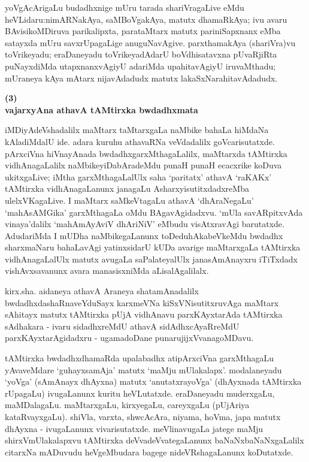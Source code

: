 yoVgAcArigaLu budadhxnige mUru tarada shariVragaLive eMdu heVLidaru:\break nimARNa\-kAya, saMBoVgakAya, matutx dhamaRkAya; ivu avaru BAvisi\-koMDi\-ruva parikalipxta, parataMtarx matutx pariniSapxnanx eMba satayxda mUru savxrUpagaLige anuguNa\-vAgive. parxthamakAya (shariVra)vu toVrikeyadu; eraDaneyadu toVrikeyadAdarU boVdhisatavxna pUvaRjiRta puNayxdiMda utapxnanxvAgiyU adariMda upahitavAgiyU iruvaMthadu; mUraneya kAya mAtarx nijavAdadudx matutx lakaSxNarahitavAdadudx.

\newpage

\begin{center}
{\textbf{\Large (3)}}\\[5pt]
{\textbf{\Large vajarxyAna athavA tAMtirxka bwdadhxmata}}
\end{center}

iMDiyAdeVshadalilx maMtarx taMtarxgaLa naMbike bahaLa hiMdaNa kAladiMdalU ide. adara kuruhu athavaRNa veVdadalilx goVcarisutatxde. pArxciVna hiVnayAnada bwdadhxgarxMthagaLalilx, maMtarxda tAMtirxka vidhAnagaLalilx naMbikeyiDabAradeMdu punaH punaH ecacxrike koDuva ukitxgaLive; iMtha garxMthagaLalUlx saha `paritatx' athavA `raKAKx' tAMtirxka vidhAnagaLanunx janagaLu AsharxyisutitxdadxreMba ulelxVKagaLive. I maMtarx saMkeVtagaLu athavA `dhAraNegaLu' `mahAsAMGika' garxMthagaLa oMdu BAgavAgidadxvu. `mUla savARpitxvAda vinaya'dalilx `mahAmAyAviV dhAriNiV' eMbudu visAtxravAgi barutatxde. AdudariMda I mUDha naMbikegaLanunx toDeduhAkabeVkeMdu bwdadhx sharxmaNaru bahaLavAgi yatinxsidarU kUDa avarige maMtarxgaLa tAMtirxka vidhAnagaLalUlx matutx avugaLa saPalateyalUlx janasAmAnayxru iTiTxdadx vishAvxsavanunx avara manasisxniMda aLisalAgalilalx.

kirx.sha. aidaneya athavA Araneya shatamAnadalilx bwdadhxdashaRnaveYduSayx karxmeVNa kiSxVNisutitxruvAga maMtarx sAhitayx matutx tAMtirxka pUjA vidhAnavu parxKAyxtarAda tAMtirxka sAdhakara - ivaru sidadhxreMdU athavA sidAdhxcAyaRreMdU parxKAyxtarAgidadxru - ugamadoDane punarujijxVvanagoMDavu.

tAMtirxka bwdadhxdhamaRda upalabadhx atipArxciVna garxMthagaLu yAvaveMdare `guhayxsamAja' matutx `maMju mUlakalapx'. modalaneyadu `yoVga' (sAmAnayx dhAyxna) matutx `anutatxrayoVga' (dhAyxnada tAMtirxka rUpagaLu) ivugaLanunx kuritu heVLutatxde. eraDaneyadu muderxgaLu, maMDalagaLu. maMtarxgaLu, kirxyegaLu, careyxgaLu (pUjAriya kataRvayxgaLu). shiVla, varxta, shwcAcAra, niyama, hoVma, japa matutx dhAyxna - ivugaLanunx vivarisutatxde. meVlinavugaLa jatege maMju shirxVmUlakalapxvu tAMtirxka deVvadeVvategaLanunx baNaNxbaNaNxgaLalilx citarxNa mADuvudu heVgeMbudara bagege nideVRshagaLanunx koDutatxde.

